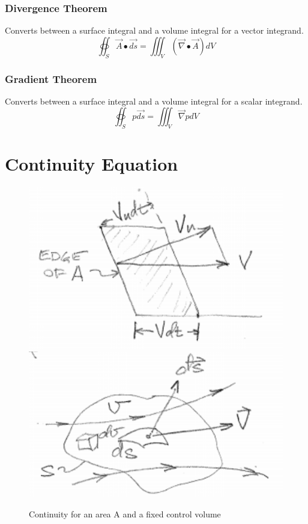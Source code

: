 \documentclass[draft=false, titlepage]{article}
\newcommand{\gradient}{\vec{\nabla}}
\begin{document}
\subsubsection{Divergence Theorem}
Converts between a surface integral and a volume integral for a vector integrand.
\begin{equation}
    \oiint_S\vec{A}\bullet \vec{ds} = \iiint_V (\gradient \bullet \vec{A})dV
\end{equation}
\subsubsection{Gradient Theorem}
Converts between a surface integral and a volume integral for a scalar integrand.
\begin{equation}
    \oiint_S p\vec{ds} = \iiint_V \gradient p dV
\end{equation}

\section{Continuity Equation}

\begin{figure}
    \centering
    \includegraphics[width=0.4\linewidth]{Figures/continuity_A}
    \includegraphics[width=0.4\linewidth]{Figures/continuity_CV}
    \caption{Continuity for an area A and a fixed control volume}
    \label{fig:continuity_CV}
\end{figure}
\end{document}
